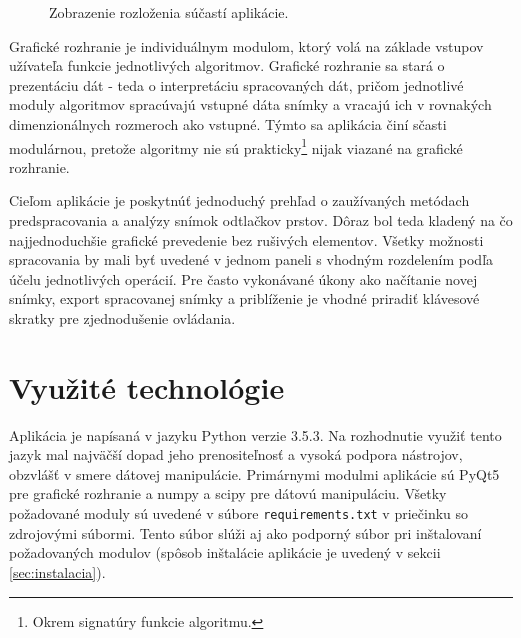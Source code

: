   \begin{figure}[h]
    \centering
    \caption{Zobrazenie rozloženia súčastí aplikácie.}
    \label{obr:sucasti_app}
  \end{figure}

  Grafické rozhranie je individuálnym modulom, ktorý volá na základe vstupov užívateľa funkcie jednotlivých algoritmov. Grafické rozhranie sa stará
  o prezentáciu dát - teda o interpretáciu spracovaných dát, pričom jednotlivé moduly algoritmov spracúvajú vstupné dáta snímky a vracajú ich v rovnakých
  dimenzionálnych rozmeroch ako vstupné. Týmto sa aplikácia činí sčasti modulárnou, pretože algoritmy nie sú prakticky\footnote{Okrem signatúry funkcie
  algoritmu.} nijak viazané na grafické rozhranie.

  Cieľom aplikácie je poskytnúť jednoduchý prehľad o zaužívaných metódach predspracovania a analýzy snímok odtlačkov prstov. Dôraz bol teda kladený na
  čo najjednoduchšie grafické prevedenie bez rušivých elementov. Všetky možnosti spracovania by mali byť uvedené v jednom paneli s vhodným rozdelením podľa
  účelu jednotlivých operácií. Pre často vykonávané úkony ako načítanie novej snímky, export spracovanej snímky a priblíženie je vhodné priradiť
  klávesové skratky pre zjednodušenie ovládania.

  \section{Využité technológie}
  Aplikácia je napísaná v jazyku Python verzie 3.5.3. Na rozhodnutie využiť tento jazyk mal najväčší dopad jeho prenositeľnosť a vysoká podpora nástrojov,
  obzvlášť v smere dátovej manipulácie. Primárnymi modulmi aplikácie sú PyQt5 pre grafické rozhranie a numpy a scipy pre dátovú manipuláciu. Všetky
  požadované moduly sú uvedené v súbore \texttt{requirements.txt} v priečinku so zdrojovými súbormi. Tento súbor slúži aj ako podporný súbor pri inštalovaní
  požadovaných modulov (spôsob inštalácie aplikácie je uvedený v sekcii \ref{sec:instalacia}).

